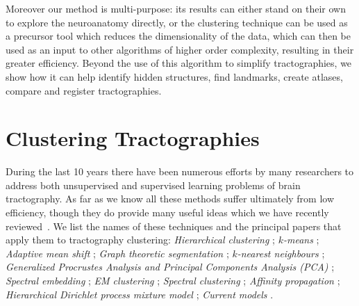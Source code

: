 \documentclass[preprint,authoryear,a4paper,10pt,onecolumn]{elsarticle}
\begin{document}
Moreover our method is multi-purpose: its results can either stand on
their own to explore the neuroanatomy directly, or the clustering
technique can be used as a precursor tool which reduces the
dimensionality of the data, which can then be used as an input to other
algorithms of higher order complexity, resulting in their greater
efficiency. Beyond the use of this algorithm to simplify tractographies,
we show how it can help identify hidden structures, find landmarks,
create atlases, compare and register tractographies.

\section{Clustering Tractographies}

During the last 10 years there have been numerous efforts by many
researchers to address both unsupervised and supervised learning
problems of brain tractography. As far as we know all these methods
suffer ultimately from low efficiency, though they do provide many
useful ideas which we have recently
reviewed~\citep{Garyfallidis_thesis}.  We list the names of these
techniques and the principal papers that apply them to tractography
clustering: \textit{Hierarchical clustering} \citep{Visser2010,
  gerig2004analysis, Guevara2010, zhang2005dti, jianu2009exploring};
\textit{$k$-means} \citep{ElKouby2005, Tsai2007}; \textit{Adaptive mean
  shift} \citep{zvitia2008adaptive, Zvitia2010}; \textit{Graph theoretic
  segmentation} \citep{brun2004clustering}; \textit{$k$-nearest
  neighbours} \citep{Ding2003a}; \textit{Generalized Procrustes Analysis
  and Principal Components Analysis (PCA)} \citep{Corouge2004,
  corouge2004towards, Corouge2006}; \textit{Spectral embedding}
\citep{ODonnell_IEEETMI07}; \textit{EM clustering}
\citep{Maddah_MICCA2005, maddah2006statistical, Maddah_IEEEBI2008,
  ziyan2009consistency}; \textit{Spectral clustering}
\citep{jonasson2005fiber}; \textit{Affinity propagation}
\citep{leemans17new, malcolm2009filtered}; \textit{Hierarchical
  Dirichlet process mixture model} \citep{wang2010tractography};
\textit{Current models} \citep{Durrleman2009,
  durrleman2010registration}.



\end{document}
